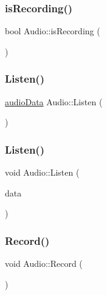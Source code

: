 \subsubsection{\texorpdfstring{is\+Recording()}{isRecording()}}
{\footnotesize\ttfamily bool Audio\+::is\+Recording (\begin{DoxyParamCaption}{ }\end{DoxyParamCaption})}

\mbox{\label{classAudio_a4fba3b2f9ea1e28f90b338a7cccd4d89}} 
\subsubsection{\texorpdfstring{Listen()}{Listen()}\hspace{0.1cm}{\footnotesize\ttfamily [1/2]}}
{\footnotesize\ttfamily \hyperlink{structaudioData}{audio\+Data} Audio\+::\+Listen (\begin{DoxyParamCaption}{ }\end{DoxyParamCaption})}

\mbox{\label{classAudio_a9eead377be9b7fbab2c49fa90007ebc1}} 
\subsubsection{\texorpdfstring{Listen()}{Listen()}\hspace{0.1cm}{\footnotesize\ttfamily [2/2]}}
{\footnotesize\ttfamily void Audio\+::\+Listen (\begin{DoxyParamCaption}\item[{\hyperlink{structaudioData}{audio\+Data} \&}]{data }\end{DoxyParamCaption})}

\mbox{\label{classAudio_a43d80bf049a368b27573974f8e5489a0}} 
\subsubsection{\texorpdfstring{Record()}{Record()}}
{\footnotesize\ttfamily void Audio\+::\+Record (\begin{DoxyParamCaption}{ }\end{DoxyParamCaption})}


